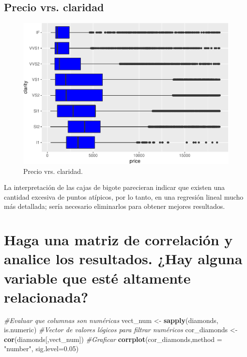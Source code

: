 \documentclass[
]{article}
\newenvironment{Shaded}{\begin{snugshade}}{\end{snugshade}}
\newcommand{\CommentTok}[1]{\textcolor[rgb]{0.56,0.35,0.01}{\textit{#1}}}
\newcommand{\DataTypeTok}[1]{\textcolor[rgb]{0.13,0.29,0.53}{#1}}
\newcommand{\FloatTok}[1]{\textcolor[rgb]{0.00,0.00,0.81}{#1}}
\newcommand{\KeywordTok}[1]{\textcolor[rgb]{0.13,0.29,0.53}{\textbf{#1}}}
\newcommand{\NormalTok}[1]{#1}
\newcommand{\StringTok}[1]{\textcolor[rgb]{0.31,0.60,0.02}{#1}}
\begin{document}
\hypertarget{precio-vrs.-claridad}{%
\subsection{Precio vrs. claridad}\label{precio-vrs.-claridad}}

\begin{figure}[H]

{\centering \includegraphics[width=0.75\linewidth]{Lab4_files/figure-latex/unnamed-chunk-7-1} 

}

\caption{Precio vrs. claridad.}\label{fig:unnamed-chunk-7}
\end{figure}

La interpretación de las cajas de bigote parecieran indicar que existen una cantidad excesiva de puntos atípicos, por lo tanto, en una regresión lineal mucho más detallada; sería necesario eliminarlos para obtener mejores resultados. 

\hypertarget{haga-una-matriz-de-correlaciuxf3n-y-analice-los-resultados.-hay-alguna-variable-que-estuxe9-altamente-relacionada}{%
\section{Haga una matriz de correlación y analice los resultados. ¿Hay
alguna variable que esté altamente
relacionada?}\label{haga-una-matriz-de-correlaciuxf3n-y-analice-los-resultados.-hay-alguna-variable-que-estuxe9-altamente-relacionada}}

\begin{Shaded}
\begin{Highlighting}[]
\CommentTok{#Evaluar que columnas son numéricas}
\NormalTok{vect_num <-}\StringTok{ }\KeywordTok{sapply}\NormalTok{(diamonds, is.numeric)}
\CommentTok{#Vector de valores lógicos para filtrar numéricos}
\NormalTok{cor_diamonds <-}\StringTok{ }\KeywordTok{cor}\NormalTok{(diamonds[,vect_num])}
\CommentTok{#Graficar}
\KeywordTok{corrplot}\NormalTok{(cor_diamonds,}\DataTypeTok{method =} \StringTok{"number"}\NormalTok{, }\DataTypeTok{sig.level=}\FloatTok{0.05}\NormalTok{)}
\end{Highlighting}
\end{Shaded}
\end{document}
